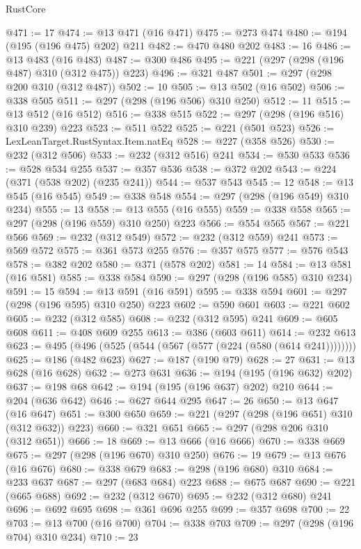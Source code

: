 \begin{lexlean}{RustCore}
\begin{coremodule}
@471 := 17
@474 := @13 @471 (@16 @471)
@475 := @273 @474
@480 := @194 (@195 (@196 @475) @202) @211
@482 := @470 @480 @202
@483 := 16
@486 := @13 @483 (@16 @483)
@487 := @300 @486
@495 := @221 (@297 (@298 (@196 @487) @310 (@312 @475)) @223)
@496 := @321 @487
@501 := @297 (@298 @200 @310 (@312 @487))
@502 := 10
@505 := @13 @502 (@16 @502)
@506 := @338 @505
@511 := @297 (@298 (@196 @506) @310 @250)
@512 := 11
@515 := @13 @512 (@16 @512)
@516 := @338 @515
@522 := @297 (@298 (@196 @516) @310 @239) @223
@523 := @511 @522
@525 := @221 (@501 @523)
@526 := LexLeanTarget.RustSyntax.Item.natEq
@528 := @227 (@358 @526)
@530 := @232 (@312 @506)
@533 := @232 (@312 @516) @241
@534 := @530 @533
@536 := @528 @534 @255
@537 := @357 @536
@538 := @372 @202
@543 := @224 (@371 (@538 @202) (@235 @241))
@544 := @537 @543
@545 := 12
@548 := @13 @545 (@16 @545)
@549 := @338 @548
@554 := @297 (@298 (@196 @549) @310 @234)
@555 := 13
@558 := @13 @555 (@16 @555)
@559 := @338 @558
@565 := @297 (@298 (@196 @559) @310 @250) @223
@566 := @554 @565
@567 := @221 @566
@569 := @232 (@312 @549)
@572 := @232 (@312 @559) @241
@573 := @569 @572
@575 := @361 @573 @255
@576 := @357 @575
@577 := @576 @543
@578 := @382 @202
@580 := @371 (@578 @202)
@581 := 14
@584 := @13 @581 (@16 @581)
@585 := @338 @584
@590 := @297 (@298 (@196 @585) @310 @234)
@591 := 15
@594 := @13 @591 (@16 @591)
@595 := @338 @594
@601 := @297 (@298 (@196 @595) @310 @250) @223
@602 := @590 @601
@603 := @221 @602
@605 := @232 (@312 @585)
@608 := @232 (@312 @595) @241
@609 := @605 @608
@611 := @408 @609 @255
@613 := @386 (@603 @611)
@614 := @232 @613
@623 := @495 (@496 (@525 (@544 (@567 (@577 (@224 (@580 (@614 @241))))))))
@625 := @186 (@482 @623)
@627 := @187 (@190 @79)
@628 := 27
@631 := @13 @628 (@16 @628)
@632 := @273 @631
@636 := @194 (@195 (@196 @632) @202)
@637 := @198 @68
@642 := @194 (@195 (@196 @637) @202) @210
@644 := @204 (@636 @642)
@646 := @627 @644 @295
@647 := 26
@650 := @13 @647 (@16 @647)
@651 := @300 @650
@659 := @221 (@297 (@298 (@196 @651) @310 (@312 @632)) @223)
@660 := @321 @651
@665 := @297 (@298 @206 @310 (@312 @651))
@666 := 18
@669 := @13 @666 (@16 @666)
@670 := @338 @669
@675 := @297 (@298 (@196 @670) @310 @250)
@676 := 19
@679 := @13 @676 (@16 @676)
@680 := @338 @679
@683 := @298 (@196 @680) @310
@684 := @233 @637
@687 := @297 (@683 @684) @223
@688 := @675 @687
@690 := @221 (@665 @688)
@692 := @232 (@312 @670)
@695 := @232 (@312 @680) @241
@696 := @692 @695
@698 := @361 @696 @255
@699 := @357 @698
@700 := 22
@703 := @13 @700 (@16 @700)
@704 := @338 @703
@709 := @297 (@298 (@196 @704) @310 @234)
@710 := 23

\end{coremodule}
\end{lexlean}
